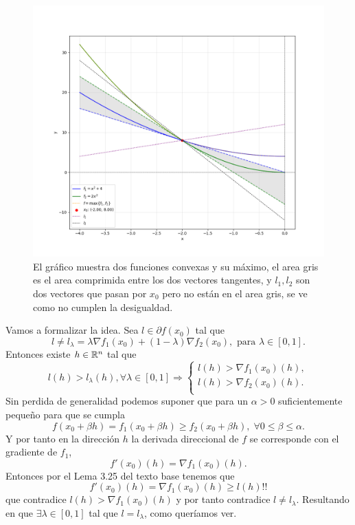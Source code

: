 \begin{figure}[h]
\centering
\includegraphics[scale=0.6]{ex3_plot.png}
\caption{
    El gráfico muestra dos funciones convexas y su máximo,
    el area gris es el area comprimida entre los dos vectores tangentes,
    y $l_1, l_2$ son dos vectores que pasan por $x_0$ pero no están en el area gris,
    se ve como no cumplen la desigualdad.
}
\label{ex3_plot}
\end{figure}

Vamos a formalizar la idea.
Sea $l \in \partial f(x_0)$ tal que
\begin{equation*}
    l \neq l_{\lambda} = \lambda \nabla f_1 (x_0) + (1 - \lambda) \nabla f_2 (x_0), \text{ para } \lambda \in [0, 1].
\end{equation*}
Entonces existe $h \in \mathbb{R}^n$ tal que
\begin{equation*}
    l(h) > l_{\lambda}(h), \forall \lambda \in [0, 1] \Rightarrow
    \left\{
    \begin{aligned}
        l(h) > \nabla f_1(x_0)(h), \\
        l(h) > \nabla f_2(x_0)(h). \\
    \end{aligned}
    \right.
\end{equation*}
Sin perdida de generalidad podemos suponer que para un $\alpha > 0$ suficientemente pequeño para que se cumpla
\begin{equation*}
    f(x_0 + \beta h) = f_1(x_0 + \beta h) \geq f_2(x_0 + \beta h), \; \forall 0 \leq \beta \leq \alpha.
\end{equation*}
Y por tanto en la dirección $h$ la derivada direccional de $f$ se corresponde con el gradiente de $f_1$,
\begin{equation*}
    f'(x_0)(h) = \nabla f_1(x_0)(h).
\end{equation*}
Entonces por el Lema 3.25 del texto base tenemos que
\begin{equation*}
    f'(x_0)(h) = \nabla f_1(x_0)(h) \geq l(h) !!
\end{equation*}
que contradice $l(h) > \nabla f_1(x_0)(h)$ y por tanto contradice $l \neq l_{\lambda}$.
Resultando en que $\exists \lambda \in [0,1]$ tal que $l = l_{\lambda}$, como queríamos ver.
